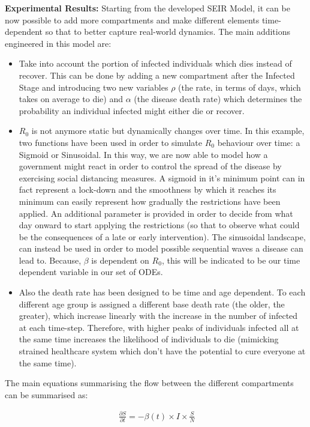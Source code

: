\textbf{Experimental Results:} Starting from the developed SEIR Model, it can be now possible to add more compartments and make different elements time-dependent so that to better capture real-world dynamics. The main additions engineered in this model are:
\begin{itemize}
    \item Take into account the portion of infected individuals which dies instead of recover. This can be done by adding a new compartment after the Infected Stage and introducing two new variables $\rho$ (the rate, in terms of days, which takes on average to die) and $\alpha$ (the disease death rate) which determines the probability an individual infected might either die or recover.
    \item $R_{0}$ is not anymore static but dynamically changes over time. In this example, two functions have been used  in order to simulate $R_{0}$ behaviour over time: a Sigmoid or Sinusoidal. In this way, we are now able to model
    how a government might react in order to control the spread of the disease by exercising social distancing measures. A sigmoid in it's minimum point can in fact represent a lock-down and the smoothness by which it reaches its minimum can
    easily represent how gradually the restrictions have been applied. An additional parameter is provided in order to decide from what day onward to start applying the restrictions (so that to observe what could be the consequences of a late or early intervention). The sinusoidal landscape, can instead be used in order to model possible sequential waves a disease can lead to. Because, $\beta$ is dependent on  $R_{0}$, this will be indicated to be our time dependent variable in our set of ODEs. 
    \item Also the death rate has been designed to be time and age dependent. To each different age group is assigned a different base death rate (the older, the greater), which increase linearly with the increase in the number of infected at each time-step. Therefore, with higher peaks of individuals infected all at the same time increases the likelihood of individuals to die (mimicking strained healthcare system which don't have the potential to cure everyone at the same time).
\end{itemize}

The main equations summarising the flow between the different compartments can be summarised as:

\useshortskip
\begin{align}
\ \frac{\partial S}{\partial t} = -\beta(t) \times I \times \frac{S}{N}
\end{align}
\useshortskip

